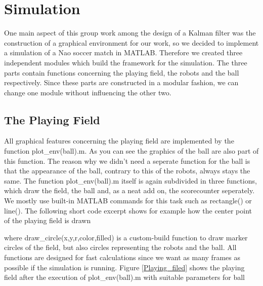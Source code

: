 
\chapter{Simulation}

One main aspect of this group work among the design of a Kalman filter was the construction of a graphical environment for our work, so we decided to implement a simulation of a Nao soccer match in MATLAB. Therefore we created three independent modules which build the framework for the simulation. The three parts contain functions concerning the playing field, the robots and the ball respectively. Since these parts are constructed in a modular fashion, we can change one module without influencing the other two.


\section{The Playing Field}

All graphical features concerning the playing field are implemented by the function {\selectfont plot\_env(ball).m}. As you can see the graphics of the ball are also part of this function. The reason why we didn't need a seperate function for the ball is that the appearance of the ball, contrary to this of the robots, always stays the same. The function {\selectfont plot\_env(ball).m} itself is again subdivided in three functions, which draw the field, the ball and, as a neat add on, the scorecounter seperately. We mostly use built-in MATLAB commands for this task such as {\selectfont rectangle()} or {\selectfont line()}. The following short code excerpt shows for example how the center point of the playing field is drawn


\parskip 20pt

where {\selectfont draw\_circle(x,y,r,color,filled)} is a custom-build function to draw marker circles of the field, but also circles representing the robots and the ball. All functions are designed for fast calculations since we want as many frames as possible if the simulation is running. Figure \ref{Playing_filed} shows the playing field after the execution of {\selectfont plot\_env(ball).m} with suitable parameters for {\selectfont ball}
\parskip 10pt


